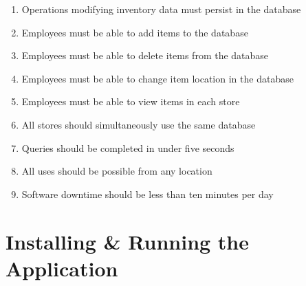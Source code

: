 \documentclass[letterpaper, 12pt]{article}
\begin{document}
\begin{enumerate}
\item Operations modifying inventory data must persist in the database
\item Employees must be able to add items to the database
\item Employees must be able to delete items from the database
\item Employees must be able to change item location in the database
\item Employees must be able to view items in each store
\item All stores should simultaneously use the same database
\item Queries should be completed in under five seconds
\item All uses should be possible from any location
\item Software downtime should be less than ten minutes per day
\end{enumerate}



%
%

\section{Installing & Running the Application}
\end{document}
